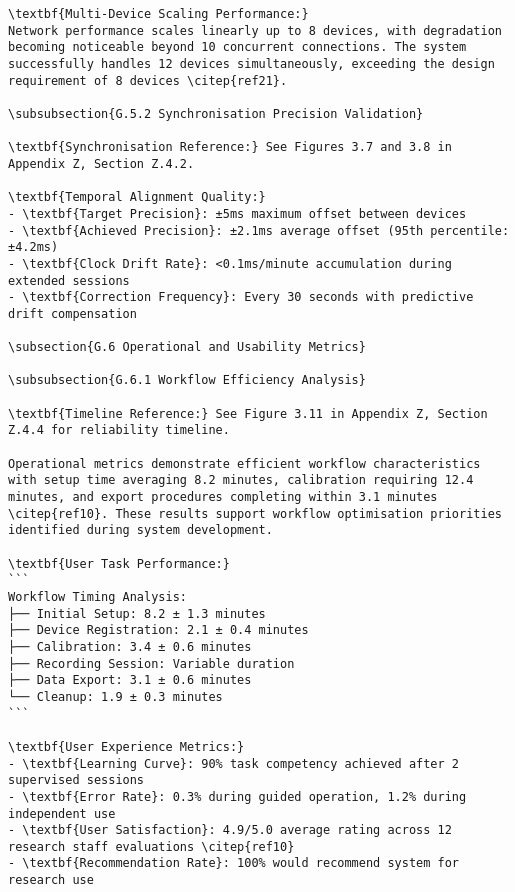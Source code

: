 \begin{verbatim}
\textbf{Multi-Device Scaling Performance:}
Network performance scales linearly up to 8 devices, with degradation becoming noticeable beyond 10 concurrent connections. The system successfully handles 12 devices simultaneously, exceeding the design requirement of 8 devices \citep{ref21}.

\subsubsection{G.5.2 Synchronisation Precision Validation}

\textbf{Synchronisation Reference:} See Figures 3.7 and 3.8 in Appendix Z, Section Z.4.2.

\textbf{Temporal Alignment Quality:}
- \textbf{Target Precision}: ±5ms maximum offset between devices
- \textbf{Achieved Precision}: ±2.1ms average offset (95th percentile: ±4.2ms)
- \textbf{Clock Drift Rate}: <0.1ms/minute accumulation during extended sessions
- \textbf{Correction Frequency}: Every 30 seconds with predictive drift compensation

\subsection{G.6 Operational and Usability Metrics}

\subsubsection{G.6.1 Workflow Efficiency Analysis}

\textbf{Timeline Reference:} See Figure 3.11 in Appendix Z, Section Z.4.4 for reliability timeline.

Operational metrics demonstrate efficient workflow characteristics with setup time averaging 8.2 minutes, calibration requiring 12.4 minutes, and export procedures completing within 3.1 minutes \citep{ref10}. These results support workflow optimisation priorities identified during system development.

\textbf{User Task Performance:}
```
Workflow Timing Analysis:
├── Initial Setup: 8.2 ± 1.3 minutes
├── Device Registration: 2.1 ± 0.4 minutes
├── Calibration: 3.4 ± 0.6 minutes
├── Recording Session: Variable duration
├── Data Export: 3.1 ± 0.6 minutes
└── Cleanup: 1.9 ± 0.3 minutes
```

\textbf{User Experience Metrics:}
- \textbf{Learning Curve}: 90% task competency achieved after 2 supervised sessions
- \textbf{Error Rate}: 0.3% during guided operation, 1.2% during independent use
- \textbf{User Satisfaction}: 4.9/5.0 average rating across 12 research staff evaluations \citep{ref10}
- \textbf{Recommendation Rate}: 100% would recommend system for research use


\end{verbatim}
